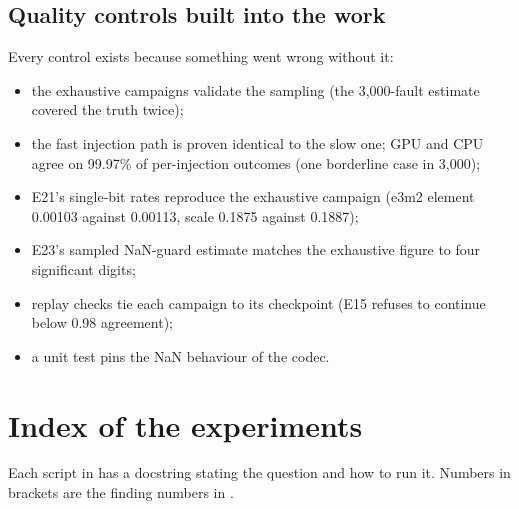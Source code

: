 \subsection{Quality controls built into the work}
Every control exists because something went wrong without it:
\begin{itemize}
\item the exhaustive campaigns validate the sampling (the 3{,}000-fault estimate covered the truth twice);
\item the fast injection path is proven identical to the slow one; GPU and CPU agree on 99.97\% of per-injection outcomes (one borderline case in 3{,}000);
\item E21's single-bit rates reproduce the exhaustive campaign (e3m2 element 0.00103 against 0.00113, scale 0.1875 against 0.1887);
\item E23's sampled NaN-guard estimate matches the exhaustive figure to four significant digits;
\item replay checks tie each campaign to its checkpoint (E15 refuses to continue below 0.98 agreement);
\item a unit test pins the NaN behaviour of the codec.
\end{itemize}

\section{Index of the experiments}
Each script in  has a docstring stating the question and how to run it. Numbers in brackets are the finding numbers in .

